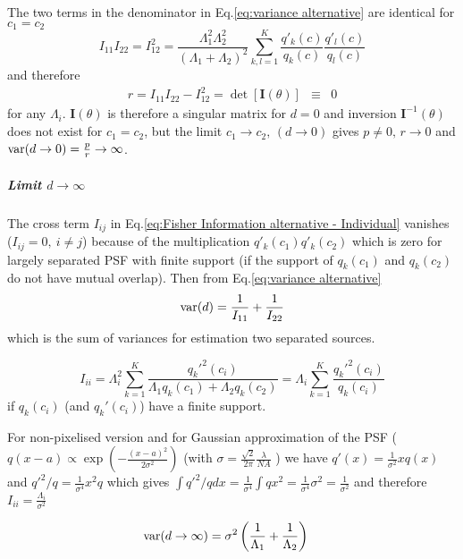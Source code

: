 The two terms in the denominator in Eq.\eqref{eq:variance alternative} are identical for $c_1=c_2$
\begin{equation}
	I_{11}I_{22}=I_{12}^2=\frac{\Lambda_1^2\Lambda_2^2}{\left(\Lambda_1+\Lambda_2\right)^2}\sum_{k,l=1}^{K}\frac{q'_k(c)}{q_k(c)}\frac{q'_{l}(c)}{q_{l}(c)}
\end{equation}
%
and therefore 
%
\begin{eqnarray*}
	r=I_{11}I_{22}-I_{12}^2=\det\left[\bm{I}(\theta)\right] & \equiv & 0
\end{eqnarray*}
%
for any $\Lambda_i$. $\bm{I}(\theta)$ is therefore a singular matrix for $d=0$ and inversion $\bm{I}^{-1}(\theta)$ does not exist for $c_1=c_2$, but the limit $c_1\rightarrow c_2,\,(d\rightarrow0)$ gives $p\neq0,\, r\rightarrow0$ and $\mathrm{var}(d\rightarrow0)=\frac{p}{r}\rightarrow\infty$. 

\subparagraph*{Limit $d\rightarrow\infty$}
The cross term $I_{ij}$ in Eq.\ref{eq:Fisher Information alternative - Individual} vanishes ($I_{ij}=0,\: i\neq j$) because of the multiplication $q'_k(c_1)q'_k(c_2)$ which is zero for largely separated PSF with finite support (if the support of $q_k(c_1)$ and $q_k(c_2)$ do not have mutual overlap). Then from Eq.\ref{eq:variance alternative} 
%
\begin{equation}
	\mathrm{var}(d)=\frac{1}{I_{11}}+\frac{1}{I_{22}}
\end{equation}
%
which is the sum of variances for estimation two separated sources.

\begin{equation}
	I_{ii}=\Lambda_i^2\sum_{k=1}^{K}\frac{q_k'^2(c_i)}{\Lambda_1q_k(c_1)+\Lambda_2q_k(c_2)}=\Lambda_i\sum_{k=1}^{K}\frac{q_k'^2(c_i)}{q_k(c_i)}
\end{equation}
%
if $q_k(c_i)$ (and $q_k'(c_i)$) have a finite support.

For non-pixelised version and for Gaussian approximation of the PSF ($q(x-a)\propto\exp\left(-\frac{(x-a)^2}{2\sigma^2}\right)$ (with
$\sigma=\frac{\sqrt{2}}{2\pi}\frac{\lambda}{NA}$ \cite{Zhang2007}) we have $q'(x)=\frac{1}{\sigma^2}xq(x)$ and $q'^2/q=\frac{1}{\sigma^{4}}x^2q$ which gives $\int q'^2/qdx=\frac{1}{\sigma^{4}}\int qx^2=\frac{1}{\sigma^{4}}\sigma^2=\frac{1}{\sigma^2}$ and therefore $I_{ii}=\frac{\Lambda_i}{\sigma^2}$ 

\begin{alignat*}{1}
	\mathrm{var}(d\rightarrow\infty) & =\sigma^2\left(\frac{1}{\Lambda_1}+\frac{1}{\Lambda_2}\right)
\end{alignat*}

